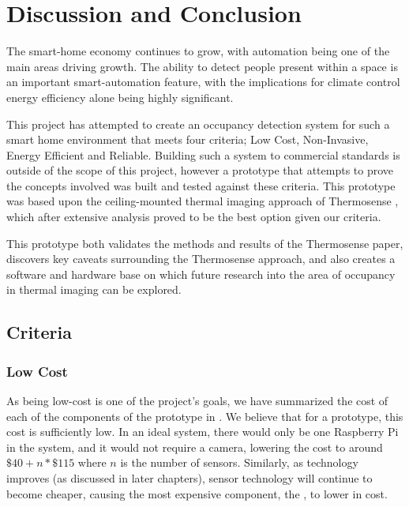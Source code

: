 \documentclass[../thesis/thesis.tex]{subfiles}
\begin{document}
 \chapter{Discussion and Conclusion}


The smart-home economy continues to grow, with automation being one of the main areas driving growth. The ability to detect people present within a space is an important smart-automation feature, with the implications for climate control energy efficiency alone being highly significant.

This project has attempted to create an occupancy detection system for such a smart home environment that meets four criteria; Low Cost, Non-Invasive, Energy Efficient and Reliable. Building such a system to commercial standards is outside of the scope of this project, however a prototype that attempts to prove the concepts involved was built and tested against these criteria. This prototype was based upon the ceiling-mounted thermal imaging approach of Thermosense \cite{beltran2013thermosense}, which after extensive analysis proved to be the best option given our criteria.

This prototype both validates the methods and results of the Thermosense paper, discovers key caveats surrounding the Thermosense approach, and also creates a software and hardware base on which future research into the area of occupancy in thermal imaging can be explored.

\section{Criteria}

\subsection{Low Cost}
As being low-cost is one of the project's goals, we have summarized the cost of each of the components of the prototype in . We believe that for a prototype, this cost is sufficiently low. In an ideal system, there would only be one Raspberry Pi in the system, and it would not require a camera, lowering the cost to around $\$40 + n * \$115$ where $n$ is the number of sensors. Similarly, as technology improves (as discussed in later chapters), sensor technology will continue to become cheaper, causing the most expensive component, the \mlx, to lower in cost.
\end{document}
